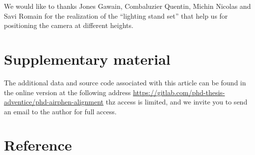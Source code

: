 \documentclass[]{elsarticle}
\begin{document}
	We would like to thanks Jones Gawain, Combaluzier Quentin, Michin Nicolas and Savi Romain
	for the realization of the ``lighting stand set'' that help us for positioning the camera at different heights.
	
	\section{Supplementary material}
	
	The additional data and source code associated with this article can be found in the online version at the following address
	\url{https://gitlab.com/phd-thesis-adventice/phd-airphen-alignment} thz access is limited,
	and we invite you to send an email to the author for full access.
	
	\section{Reference}
	
	
	
\end{document}
